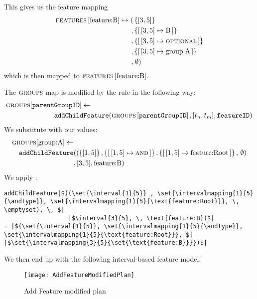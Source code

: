  This gives us the feature mapping
\begin{align*}
  \lookup{\features{}}{\text{feature:B}} \mapsto ( & \set{\interval{3}{5}} \\
  , & \set{\intervalmapping{3}{5}{\text{B}}}\\
  , & \set{\intervalmapping{3}{5}{\optional{}}}\\
  , & \set{\intervalmapping{3}{5}{\text{group:A}}}\\
  , & \; \emptyset)
\end{align*}
which is then mapped to $\textsc{features}{} \left[ \text{feature:B} \right]$.

The $\textsc{groups}{}{}$ map is modified by the rule in the following way:
\begin{align*}
  \groups{}[\var{parent}&\var{GroupID}] \assign  \\
                                &\var{addChildFeature}(\lookup{\groups{}}{\var{parentGroupID}}, \interval{t_n}{t_m}, \var{featureID})
\end{align*}
We substitute with our values:
\begin{align*}
  \groups{}[\text{group:A}] \assign & \\
  \var{addChildFeature}&((\set{\interval{1}{5}} , \set{\intervalmapping{1}{5}{\andtype}}, \set{\intervalmapping{1}{5}{\text{feature:Root}}} , \, \emptyset) \\
                                &, \interval{3}{5}, \text{feature:B})
\end{align*}
We apply :
\begin{verbatim}
addChildFeature|$((\set{\interval{1}{5}} , \set{\intervalmapping{1}{5}{\andtype}}, \set{\intervalmapping{1}{5}{\text{feature:Root}}}, \, \emptyset), \, $|
                  |$\interval{3}{5}, \, \text{feature:B})$|
= |$(\set{\interval{1}{5}}, \set{\intervalmapping{1}{5}{\andtype}}, \set{\intervalmapping{1}{5}{\text{feature:Root}}}, $| |$\set{\intervalmapping{3}{5}{\set{\text{feature:B}}}})$|
\end{verbatim}

We then end up with the following interval-based feature model:

\begin{figure}[htbp]
  \centering
  \texttt{[image: AddFeatureModifiedPlan]}
  \caption{Add Feature \textemdash{} modified plan}
  \label{ex:add-feature-modified-plan}
\end{figure}

\newpage

